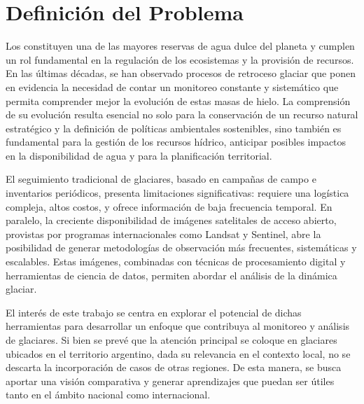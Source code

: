 \documentclass{article}
\begin{document}
\section{Definición del Problema}

Los constituyen una de las mayores reservas de agua dulce del planeta y cumplen un rol fundamental en la regulación de los ecosistemas y la provisión de recursos. En las últimas décadas, se han observado procesos de retroceso glaciar que ponen en evidencia la necesidad de contar un monitoreo constante y sistemático que permita comprender mejor la evolución de estas masas de hielo. La comprensión de su evolución resulta esencial no solo para la conservación de un recurso natural estratégico y la definición de políticas ambientales sostenibles, sino también es fundamental para la gestión de los recursos hídrico, anticipar posibles impactos en la disponibilidad de agua y para la planificación territorial.

El seguimiento tradicional de glaciares, basado en campañas de campo e inventarios periódicos, presenta limitaciones significativas: requiere una logística compleja, altos costos, y ofrece información de baja frecuencia temporal. En paralelo, la creciente disponibilidad de imágenes satelitales de acceso abierto, provistas por programas internacionales como Landsat y Sentinel, abre la posibilidad de generar metodologías de observación más frecuentes, sistemáticas y escalables. Estas imágenes, combinadas con técnicas de procesamiento digital y herramientas de ciencia de datos, permiten abordar el análisis de la dinámica glaciar.

El interés de este trabajo se centra en explorar el potencial de dichas herramientas para desarrollar un enfoque que contribuya al monitoreo y análisis de glaciares. Si bien se prevé que la atención principal se coloque en glaciares ubicados en el territorio argentino, dada su relevancia en el contexto local, no se descarta la incorporación de casos de otras regiones. De esta manera, se busca aportar una visión comparativa y generar aprendizajes que puedan ser útiles tanto en el ámbito nacional como internacional.
\end{document}
